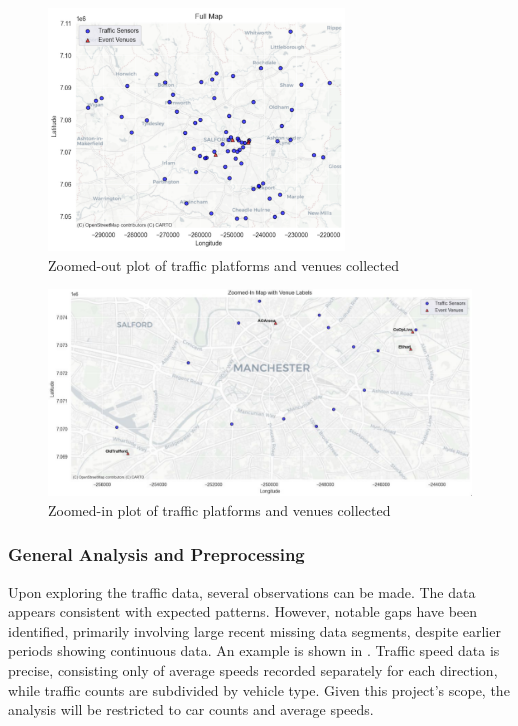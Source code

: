 \begin{figure}[!ht]
  \centering
  \includegraphics[width=0.7\textwidth]{images/design-implementation/map-out.pdf}
  \caption{Zoomed-out plot of traffic platforms and venues collected}
  \label{fig:map-out}
\end{figure}

\begin{figure}[!ht]
  \centering
  \includegraphics[width=1\textwidth]{images/design-implementation/map-in.pdf}
  \caption{Zoomed-in plot of traffic platforms and venues collected}
  \label{fig:map-in}
\end{figure}

\subsubsection{General Analysis and Preprocessing}
\label{link:data-preprocessing}
Upon exploring the traffic data, several observations can be made. The data appears consistent with expected patterns. However, notable gaps have been identified, primarily involving large recent missing data segments, despite earlier periods showing continuous data. An example is shown in . Traffic speed data is precise, consisting only of average speeds recorded separately for each direction, while traffic counts are subdivided by vehicle type. Given this project’s scope, the analysis will be restricted to car counts and average speeds.

